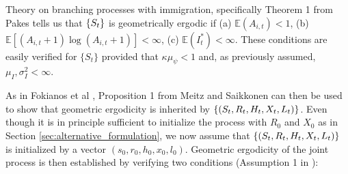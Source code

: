 \documentclass{article}
\begin{document}
Theory on branching processes with immigration, specifically Theorem 1 from Pakes \cite{Pakes1971} tells us that $\{S_t\}$ is geometrically ergodic if (a) $\mathbb{E}(A_{i, t}) < 1$, (b) $\mathbb{E}[(A_{i, t} + 1)\log(A_{i, t} + 1)] < \infty$, (c) $\mathbb{E}(I^*_t) < \infty$. These conditions are easily verified for $\{S_t\}$ provided that $\kappa\mu_\psi < 1$ and, as previously assumed, $\mu_I, \sigma^2_I < \infty$.


As in Fokianos et al \cite{Fokianos2009}, Proposition 1 from Meitz and Saikkonen \cite{Meitz2008} can then be used to show that geometric ergodicity is inherited by $\{(S_t, R_t, H_t, X_t, L_t)\}$. %
Even though it is in principle sufficient to initialize the process with $R_0$ and $X_0$ as in Section \ref{sec:alternative_formulation}, we now assume that $\{(S_t, R_t, H_t, X_t, L_t)\}$ is initialized by a vector $(s_0, r_0, h_0, x_0, l_0)$. Geometric ergodicity of the joint process is then established by verifying two conditions (Assumption 1 in \cite{Meitz2008}):
\end{document}

